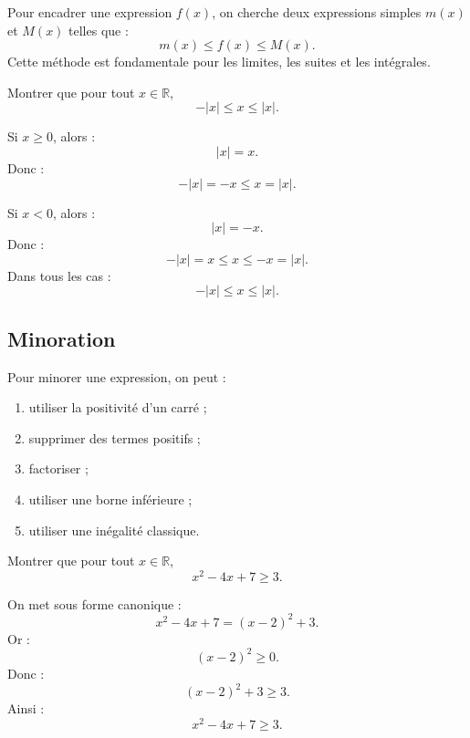 \documentclass[11pt,a4paper]{article}
\newcommand{\R}{\mathbb R}
\newcommand{\abs}[1]{\left|#1\right|}
\begin{document}
\begin{methodbox}
Pour encadrer une expression \(f(x)\), on cherche deux expressions simples \(m(x)\) et \(M(x)\) telles que :
\[
m(x)\leq f(x)\leq M(x).
\]
Cette méthode est fondamentale pour les limites, les suites et les intégrales.
\end{methodbox}

\begin{exercicebox}[Encadrement]
Montrer que pour tout \(x\in\R\),
\[
-\abs{x}\leq x\leq \abs{x}.
\]
\end{exercicebox}

\begin{correctionbox}
Si \(x\geq0\), alors :
\[
\abs{x}=x.
\]
Donc :
\[
-\abs{x}=-x\leq x=\abs{x}.
\]

Si \(x<0\), alors :
\[
\abs{x}=-x.
\]
Donc :
\[
-\abs{x}=x\leq x\leq -x=\abs{x}.
\]
Dans tous les cas :
\[
-\abs{x}\leq x\leq \abs{x}.
\]
\end{correctionbox}

\subsection{Minoration}

\begin{methodbox}
Pour minorer une expression, on peut :
\begin{enumerate}
    \item utiliser la positivité d'un carré ;
    \item supprimer des termes positifs ;
    \item factoriser ;
    \item utiliser une borne inférieure ;
    \item utiliser une inégalité classique.
\end{enumerate}
\end{methodbox}

\begin{exercicebox}[Minoration]
Montrer que pour tout \(x\in\R\),
\[
x^2-4x+7\geq3.
\]
\end{exercicebox}

\begin{correctionbox}
On met sous forme canonique :
\[
x^2-4x+7=(x-2)^2+3.
\]
Or :
\[
(x-2)^2\geq0.
\]
Donc :
\[
(x-2)^2+3\geq3.
\]
Ainsi :
\[
x^2-4x+7\geq3.
\]
\end{correctionbox}

\newpage
\end{document}
